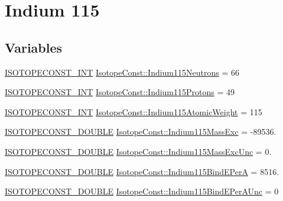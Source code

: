 \hypertarget{group___isotope_const-_indium-_in115}{}\section{Indium 115}
\label{group___isotope_const-_indium-_in115}
\subsection*{Variables}
\begin{DoxyCompactItemize}
\item 
\mbox{\hyperlink{group___isotope_const-_macros_ga5f18360b3e99483a35c32d789e62621c}{I\+S\+O\+T\+O\+P\+E\+C\+O\+N\+S\+T\+\_\+\+I\+NT}} \mbox{\hyperlink{group___isotope_const-_indium-_in115_ga9e7cbf3ac9e5c904348ab1330db314a9}{Isotope\+Const\+::\+Indium115\+Neutrons}} = 66
\item 
\mbox{\hyperlink{group___isotope_const-_macros_ga5f18360b3e99483a35c32d789e62621c}{I\+S\+O\+T\+O\+P\+E\+C\+O\+N\+S\+T\+\_\+\+I\+NT}} \mbox{\hyperlink{group___isotope_const-_indium-_in115_gaf870fd0b01ce6d291b47f55ffbae4196}{Isotope\+Const\+::\+Indium115\+Protons}} = 49
\item 
\mbox{\hyperlink{group___isotope_const-_macros_ga5f18360b3e99483a35c32d789e62621c}{I\+S\+O\+T\+O\+P\+E\+C\+O\+N\+S\+T\+\_\+\+I\+NT}} \mbox{\hyperlink{group___isotope_const-_indium-_in115_ga2bac7bd11585b10be52aea5224234eb7}{Isotope\+Const\+::\+Indium115\+Atomic\+Weight}} = 115
\item 
\mbox{\hyperlink{group___isotope_const-_macros_ga8f45a7272ce02c0b4c65c44636ed719a}{I\+S\+O\+T\+O\+P\+E\+C\+O\+N\+S\+T\+\_\+\+D\+O\+U\+B\+LE}} \mbox{\hyperlink{group___isotope_const-_indium-_in115_ga93d53466a125757b70854a4f3a47b1a7}{Isotope\+Const\+::\+Indium115\+Mass\+Exc}} = -\/89536.
\item 
\mbox{\hyperlink{group___isotope_const-_macros_ga8f45a7272ce02c0b4c65c44636ed719a}{I\+S\+O\+T\+O\+P\+E\+C\+O\+N\+S\+T\+\_\+\+D\+O\+U\+B\+LE}} \mbox{\hyperlink{group___isotope_const-_indium-_in115_gaba702d7107d26ea08984c868b79d775c}{Isotope\+Const\+::\+Indium115\+Mass\+Exc\+Unc}} = 0.
\item 
\mbox{\hyperlink{group___isotope_const-_macros_ga8f45a7272ce02c0b4c65c44636ed719a}{I\+S\+O\+T\+O\+P\+E\+C\+O\+N\+S\+T\+\_\+\+D\+O\+U\+B\+LE}} \mbox{\hyperlink{group___isotope_const-_indium-_in115_ga6c729b013500e4c70b881a618401bf4f}{Isotope\+Const\+::\+Indium115\+Bind\+E\+PerA}} = 8516.
\item 
\mbox{\hyperlink{group___isotope_const-_macros_ga8f45a7272ce02c0b4c65c44636ed719a}{I\+S\+O\+T\+O\+P\+E\+C\+O\+N\+S\+T\+\_\+\+D\+O\+U\+B\+LE}} \mbox{\hyperlink{group___isotope_const-_indium-_in115_ga089b78c3ee92ca35f19f5b07517318bf}{Isotope\+Const\+::\+Indium115\+Bind\+E\+Per\+A\+Unc}} = 0

\end{DoxyCompactItemize}
